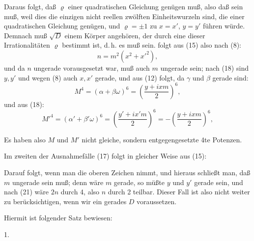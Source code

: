 
Daraus folgt, daß $\varrho$ einer quadratischen Gleichung genügen muß, also daß
sein muß, weil dies die einzigen nicht reellen zwölften Einheitswurzeln sind, die einer quadratischen Gleichung genügen, und $\varrho=\pm1$ zu $x=x'$, $y=y'$ führen würde. Demnach muß $\sqrt D$ einem Körper angehören, der durch eine dieser Irrationalitäten $\varrho$ bestimmt ist, d.\,h. es muß
sein.  folgt aus (15)
also nach (8):
\[
n=m^2(x^2+x'^2),
\]
und da $n$ ungerade vorausgesetzt war, muß auch $m$ ungerade sein; nach (18) sind $y,y'$ und wegen (8) auch $x,x'$ gerade, und aus (12) folgt, da $\gamma$ und $\beta$ gerade sind:
\[
M^4=(\alpha+\beta\omega)^6=\left(\dfrac{y+ixm}{2}\right)^6,
\]
und aus (18):
\[
M'^4=(\alpha'+\beta'\omega)^6=\left(\dfrac{y'+ix'm}{2}\right)^6=-\left(\dfrac{y+ixm}{2}\right)^6,
\]

Es haben also $M$ und $M'$ nicht gleiche, sondern entgegengesetzte 4te Potenzen.

Im zweiten der Ausnahmefälle (17) folgt in gleicher Weise aus (15):

Darauf folgt, wenn man die oberen Zeichen nimmt,
und hieraus schließt man, daß $m$ ungerade sein muß; denn wäre $m$ gerade, so müßte $y$ und $y'$ gerade sein, und nach (21) wäre $2n$ durch 4, also $n$ durch 2 teilbar. Dieser Fall ist also nicht weiter zu berücksichtigen, wenn wir ein gerades $D$ voraussetzen.

Hiermit ist folgender Satz bewiesen:

1. 
